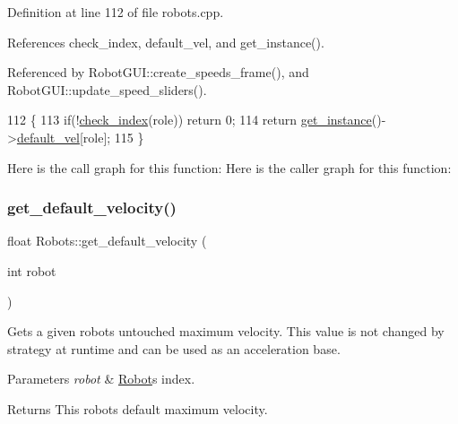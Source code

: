Definition at line 112 of file robots.\+cpp.



References check\+\_\+index, default\+\_\+vel, and get\+\_\+instance().



Referenced by Robot\+G\+U\+I\+::create\+\_\+speeds\+\_\+frame(), and Robot\+G\+U\+I\+::update\+\_\+speed\+\_\+sliders().


\begin{DoxyCode}
112                                                 \{
113     \textcolor{keywordflow}{if}(!\hyperlink{robots_8hpp_ae3e6ae8f87cdc750c0b99bc609d9ae43}{check\_index}(role)) \textcolor{keywordflow}{return} 0;
114     \textcolor{keywordflow}{return} \hyperlink{class_robots_a589bce74db5f34af384952d48435168f}{get\_instance}()->\hyperlink{class_robots_a6c03d49137645a67d5c5e39bb953a788}{default\_vel}[role];
115 \}
\end{DoxyCode}
Here is the call graph for this function\+:
Here is the caller graph for this function\+:
\mbox{\label{class_robots_a3b226dd339a3b7a41c120f7d6a1bc515}} 
\subsubsection{\texorpdfstring{get\+\_\+default\+\_\+velocity()}{get\_default\_velocity()}}
{\footnotesize\ttfamily float Robots\+::get\+\_\+default\+\_\+velocity (\begin{DoxyParamCaption}\item[{int}]{robot }\end{DoxyParamCaption})\hspace{0.3cm}{\ttfamily [static]}}

Gets a given robot\textquotesingle{}s untouched maximum velocity. This value is not changed by strategy at runtime and can be used as an acceleration base. 
\begin{DoxyParams}{Parameters}
{\em robot} & \hyperlink{struct_robots_1_1_robot}{Robot}\textquotesingle{}s index. \\
\hline
\end{DoxyParams}
\begin{DoxyReturn}{Returns}
This robot\textquotesingle{}s default maximum velocity. 
\end{DoxyReturn}


